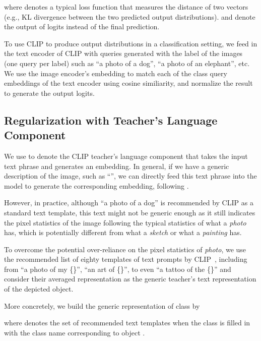 \documentclass[10pt,twocolumn,letterpaper]{article}
\begin{document}
where  denotes a typical loss function that measures the distance of two vectors (e.g., KL divergence between the two predicted output distributions). 
 and  denote the output of logits instead of the final prediction. 



To use CLIP to produce output distributions in a classification setting, 
we feed in the text encoder of CLIP with queries 
generated with the label of the images (one query per label) 
such as 
``a photo of a dog'', ``a photo of an elephant'', etc. 
We use the image encoder's embedding to match each of the class query embeddings of the text encoder using cosine similiarity, and normalize the result to generate the output logits. 














\subsection{Regularization with Teacher's Language Component}

We use  to denote the CLIP teacher's language component
that takes the input text phrase 
and generates an embedding. 
In general, if we have a generic description 
of the image, such as ``'', 
we can directly feed this text phrase into the model to generate 
the corresponding
embedding, 
following . 

However, in practice, 
although ``a photo of a dog'' 
is recommended by CLIP as a standard text template, 
this text 
might not be generic enough as it still
indicates the pixel statistics of the image 
following the typical statistics of what a \emph{photo} has, which is 
potentially different from what a \emph{sketch} or what a \emph{painting} has. 

To overcome the potential over-reliance on the pixel statistics 
of \emph{photo}, we use the recommended list of eighty templates 
of text prompts by CLIP~\cite{radford2021learning}, including from ``a photo of my \{\}'', 
``an art of \{\}'', to even ``a tattoo of the \{\}''
and consider their averaged representation as 
the generic teacher's text representation 
of the depicted object. 

More concretely, we build the generic representation of class  by 

where  denotes the set of recommended 
text templates when the class is filled in with the class
name corresponding to object . 
\end{document}
